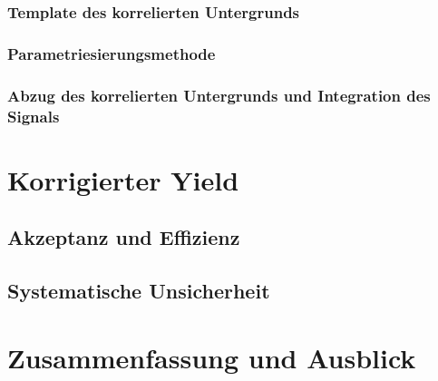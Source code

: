 \documentclass[11pt]{article}
\renewcommand{\,}{,\!} %
\begin{document}
\subsubsection{Template des korrelierten Untergrunds} \label{s3s5s2}


\subsubsection{Parametriesierungsmethode} \label{s3s5s3}


\subsubsection{Abzug des korrelierten Untergrunds und Integration des Signals} \label{s3s5s4}

\newpage
\section{Korrigierter Yield} \label{s4}

\subsection{Akzeptanz und Effizienz} \label{s4s1}


\subsection{Systematische Unsicherheit} \label{s4s2}


\newpage
\section{Zusammenfassung und Ausblick} \label{s5}

\newpage
 

\end{document}
